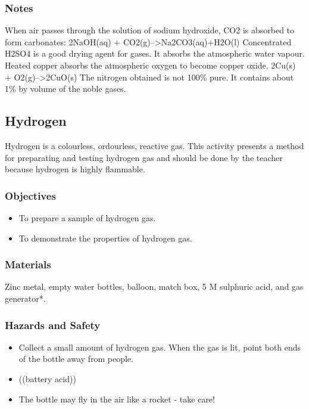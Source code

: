 \subsubsection*{Notes}
When air passes through the solution of sodium hydroxide, CO2 is absorbed to form carbonates:
2NaOH(aq) + CO2(g)-->Na2CO3(aq)+H2O(l)
Concentrated H2SO4 is a good drying agent for gases. It absorbs the atmospheric water vapour.
Heated copper absorbs the atmospheric oxygen to become copper oxide.
2Cu(s) + O2(g)-->2CuO(s)
The nitrogen obtained is not 100\% pure. It contains about 1\% by volume of the noble gases.

\subsection{Hydrogen}

Hydrogen is a colourless, ordourless, reactive gas. This activity presents a method for preparating and testing hydrogen gas and should be done by the teacher because hydrogen is highly flammable.

\subsubsection*{Objectives}
\begin{itemize}
\item{To prepare a sample of hydrogen gas.}
\item{To demonstrate the properties of hydrogen gas.}
\end{itemize}

\subsubsection*{Materials}
Zinc metal, empty water bottles, balloon, match box, 5 M sulphuric acid, and gas generator*.

\subsubsection*{Hazards and Safety}
\begin{itemize}
\item{Collect a small amount of hydrogen gas. When the gas is lit, point both ends of the bottle away from people.}
\item{ ((battery acid))}
\item{The bottle may fly in the air like a rocket - take care!}
\end{itemize}


